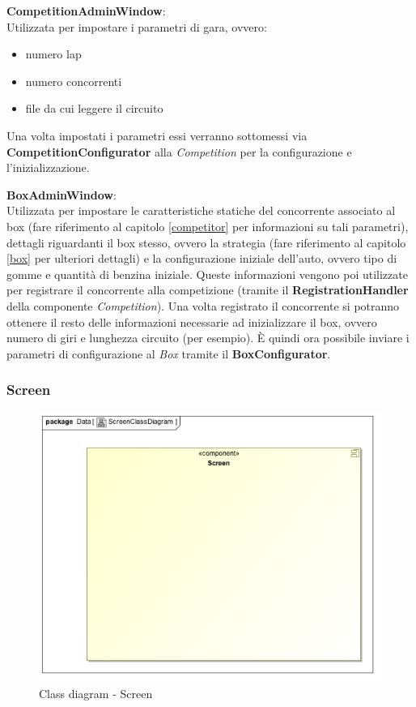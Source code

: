 \begin{description}
\item{\textbf{CompetitionAdminWindow}}:\\
Utilizzata per impostare i parametri di gara, ovvero:
\begin{itemize}
\item numero lap
\item numero concorrenti
\item file da cui leggere il circuito
\end{itemize}
Una volta impostati i parametri essi verranno sottomessi via \textbf{CompetitionConfigurator} alla \emph{Competition} per la
configurazione e l'inizializzazione.
\item{\textbf{BoxAdminWindow}}:\\
Utilizzata per impostare le caratteristiche statiche del concorrente associato al box 
(fare riferimento al capitolo \ref{competitor} per informazioni su tali parametri), dettagli riguardanti il box stesso, ovvero la strategia 
(fare riferimento al capitolo \ref{box} per ulteriori dettagli) e la configurazione iniziale dell'auto, ovvero tipo di gomme e quantit\`{a} di
benzina iniziale. Queste informazioni vengono poi utilizzate per registrare il concorrente alla competizione (tramite il \textbf{RegistrationHandler}
della componente \emph{Competition}). Una volta registrato il concorrente si potranno ottenere il resto delle informazioni necessarie
ad inizializzare il box, ovvero numero di giri e lunghezza circuito (per esempio). \`{E} quindi ora possibile inviare i parametri di configurazione
al \emph{Box} tramite il \textbf{BoxConfigurator}.
\end{description}
\newpage
\subsubsection{Screen}
\begin{center}
\begin{figure}[h!]
	\includegraphics[scale=0.50]{img/ClassDiagrams/ScreenClassDiagram.jpg}
\caption{Class diagram - Screen}
\end{figure}
\end{center}
